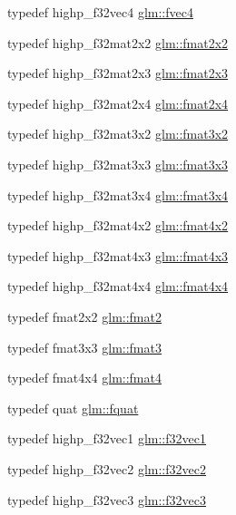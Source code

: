 \begin{CompactItemize}
\item 
typedef highp\_\-f32vec4 \hyperlink{group__gtc__type__precision_g55d1365630d3b3ecf7c7f4e7c29a9cb1}{glm::fvec4}
\item 
typedef highp\_\-f32mat2x2 \hyperlink{group__gtc__type__precision_gda7823c23ae249dccaecb5a016c667f4}{glm::fmat2x2}
\item 
typedef highp\_\-f32mat2x3 \hyperlink{group__gtc__type__precision_g087d875cd4e384f101a28a4caf8ccd94}{glm::fmat2x3}
\item 
typedef highp\_\-f32mat2x4 \hyperlink{group__gtc__type__precision_gf3af7a2f10aaf8028a95b7232b24d84e}{glm::fmat2x4}
\item 
typedef highp\_\-f32mat3x2 \hyperlink{group__gtc__type__precision_g723b6e3dd4ff1c0d76d3c9f72ea0d9a7}{glm::fmat3x2}
\item 
typedef highp\_\-f32mat3x3 \hyperlink{group__gtc__type__precision_gfa6841eaaa5ee45de1d892c26b349571}{glm::fmat3x3}
\item 
typedef highp\_\-f32mat3x4 \hyperlink{group__gtc__type__precision_g87084a1f4d6e8dd94f719029840dbafc}{glm::fmat3x4}
\item 
typedef highp\_\-f32mat4x2 \hyperlink{group__gtc__type__precision_g0cf4b66f4929b3c21ab7b967386fc7dd}{glm::fmat4x2}
\item 
typedef highp\_\-f32mat4x3 \hyperlink{group__gtc__type__precision_g5af77d2574bca528d321fbf261c90107}{glm::fmat4x3}
\item 
typedef highp\_\-f32mat4x4 \hyperlink{group__gtc__type__precision_ga641dae0fcc277f028b4e48e16bbea86}{glm::fmat4x4}
\item 
typedef fmat2x2 \hyperlink{group__gtc__type__precision_g96b15c5eaecce87b352dab5d373da979}{glm::fmat2}
\item 
typedef fmat3x3 \hyperlink{group__gtc__type__precision_ga7b09502b183884aca53338c35b09509}{glm::fmat3}
\item 
typedef fmat4x4 \hyperlink{group__gtc__type__precision_gfbea1649c5384f13ff4595c9d0003a68}{glm::fmat4}
\item 
typedef quat \hyperlink{group__gtc__type__precision_ga95d73f08018f3864c6ae08dbf1c59f2}{glm::fquat}
\item 
typedef highp\_\-f32vec1 \hyperlink{group__gtc__type__precision_g7335bddf7a09ba275d5d04f7681f03e6}{glm::f32vec1}
\item 
typedef highp\_\-f32vec2 \hyperlink{group__gtc__type__precision_g0eba48c6b8abbee31dbf5655dd171ead}{glm::f32vec2}
\item 
typedef highp\_\-f32vec3 \hyperlink{group__gtc__type__precision_g9b74939fb3bdd450be65f798037dd79d}{glm::f32vec3}

\end{CompactItemize}
